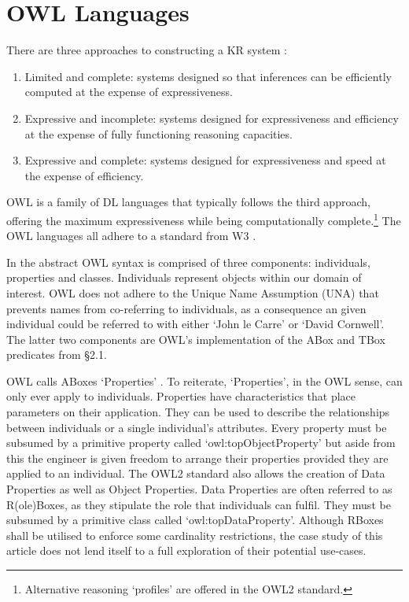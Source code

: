 \documentclass[titlepage,a4paper,12pt,oneside]{book}
\begin{document}
\section{OWL Languages}
There are three approaches to constructing a KR system \cite[23]{handbookIntro2003}:
\begin{enumerate}
\item{Limited and complete: systems designed so that inferences can be efficiently computed at the expense of expressiveness.}
\item{Expressive and incomplete: systems designed for expressiveness and efficiency at the expense of fully functioning reasoning capacities.}
\item{Expressive and complete: systems designed for expressiveness and speed at the expense of efficiency.}
\end{enumerate}
OWL is a family of DL languages that typically follows the third approach, offering the maximum expressiveness while being computationally complete.\footnote{Alternative reasoning `profiles' are offered in the OWL2 standard.}
The OWL languages all adhere to a standard from W3 \cite[10]{guide2011}.\par
In the abstract OWL syntax is comprised of three components: individuals, properties and classes.
Individuals represent objects within our domain of interest.
OWL does not adhere to the Unique Name Assumption (UNA) that prevents names from co-referring to individuals, as a consequence an given individual could be referred to with either `John le Carre' or `David Cornwell'.
The latter two components are OWL's implementation of the ABox and TBox predicates from §2.1.\par
OWL calls ABoxes `Properties' \cite[11]{guide2011}.
To reiterate, `Properties', in the OWL sense, can only ever apply to individuals.
Properties have characteristics that place parameters on their application.
They can be used to describe the relationships between individuals or a single individual's attributes.
Every property must be subsumed by a primitive property called `owl:topObjectProperty' but aside from this the engineer is given freedom to arrange their properties provided they are applied to an individual.
The OWL2 standard also allows the creation of Data Properties as well as Object Properties.
Data Properties are often referred to as R(ole)Boxes, as they stipulate the role that individuals can fulfil.
They must be subsumed by a primitive class called `owl:topDataProperty'.
Although RBoxes shall be utilised to enforce some cardinality restrictions, the case study of this article does not lend itself to a full exploration of their potential use-cases.\par
\end{document}
